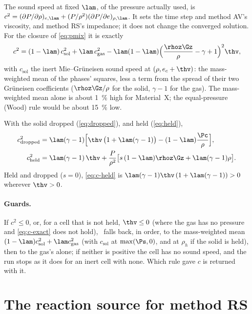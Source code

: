 The sound speed at fixed $\lam$, of the pressure actually used, is
$c^2 = (\partial P/\partial\rho)_{e,\lam} + (P/\rho^2)(\partial P/\partial
e)_{\rho,\lam}$. It sets the time step and method AV's viscosity, and method
RS's impedance; it does not change the converged solution. For the closure
of \cref{eq:pmix} it is exactly
\begin{equation}
  c^2 = (1 - \lam)\,c_{\mathrm{sol}}^2 + \lam\,c_{\mathrm{gas}}^2
        - \lam(1 - \lam)\Bigl(\frac{\rhoz\Gz}{\rho} - \gamma + 1\Bigr)^{2}\thv,
  \label{eq:c-exact}
\end{equation}
with $c_{\mathrm{sol}}$ the inert Mie--Gr\"uneisen sound speed at $(\rho,
e_c + \thv)$: the mass-weighted mean of the phases' squares, less a term
from the spread of their two Gr\"uneisen coefficients ($\rhoz\Gz/\rho$ for
the solid, $\gamma - 1$ for the gas). The mass-weighted mean alone is about
1~\% high for Material~X; the equal-pressure (Wood) rule would be about
15~\% low.

With the solid dropped (\cref{eq:dropped}), and held (\cref{eq:held}),
\begin{align}
  c^2_{\mathrm{dropped}} &= \lam(\gamma - 1)\Bigl[\thv\,\bigl(1 + \lam(\gamma - 1)\bigr)
     - (1 - \lam)\frac{\Pc}{\rho}\Bigr],
  \label{eq:c-dropped}\\
  c^2_{\mathrm{held}} &= \lam(\gamma - 1)\,\thv
     + \frac{P}{\rho^2}\bigl[s\,(1 - \lam)\rhoz\Gz + \lam(\gamma - 1)\rho\bigr].
  \label{eq:c-held}
\end{align}
Held and dropped ($s = 0$), \cref{eq:c-held} is $\lam(\gamma-1)\thv\,(1 +
\lam(\gamma - 1)) > 0$ wherever $\thv > 0$.

\paragraph{Guards.} If $c^2 \le 0$, or, for a cell that is not held,
$\thv \le 0$ (where the gas has no pressure and \cref{eq:c-exact} does not
hold), \bw\ falls back, in order, to the mass-weighted mean $(1 -
\lam)c_{\mathrm{sol}}^2 + \lam c_{\mathrm{gas}}^2$ (with $c_{\mathrm{sol}}$
at $\max(\Ps, 0)$, and at $\rho_h$ if the solid is held), then to the gas's
alone; if neither is positive the cell has no sound speed, and the run
stops as it does for an inert cell with none. Which rule gave $c$ is
returned with it.

\section{The reaction source for method RS}
\label{sec:rs-source}

